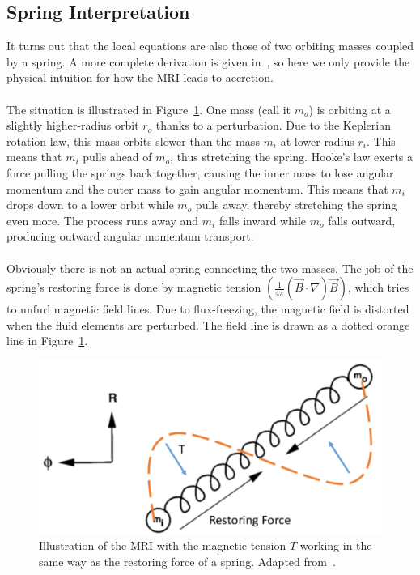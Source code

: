 \subsection{Spring Interpretation}\label{ssec:springs}
It turns out that the local equations are also those of two orbiting masses coupled by a spring. A more complete derivation is given in~, so here we only provide the physical intuition for how the MRI leads to accretion. \\
\\
The situation is illustrated in Figure~\ref{fig:springs}. One mass (call it $m_o$) is orbiting at a slightly higher-radius orbit $r_o$ thanks to a perturbation. Due to the Keplerian rotation law, this mass orbits slower than the mass $m_i$ at lower radius $r_i$. This means that $m_i$ pulls ahead of $m_o$, thus stretching the spring. Hooke's law exerts a force pulling the springs back together, causing the inner mass to lose angular momentum and the outer mass to gain angular momentum. This means that $m_i$ drops down to a lower orbit while $m_o$ pulls away, thereby stretching the spring even more. The process runs away and $m_i$ falls inward while $m_o$ falls outward, producing outward angular momentum transport. \\
\\
Obviously there is not an actual spring connecting the two masses. The job of the spring's restoring force is done by magnetic tension $\left(\frac{1}{4\pi}(\vec B\cdot\nabla)\vec B\right)$, which tries to unfurl magnetic field lines. Due to flux-freezing, the magnetic field is distorted when the fluid elements are perturbed. The field line is drawn as a dotted orange line in Figure~\ref{fig:springs}.
\begin{figure}
  \begin{center}  
    \includegraphics[width=.8\textwidth, angle=0.]{img/mriSpring.pdf}
  \end{center}
  \caption{Illustration of the MRI with the magnetic tension $T$ working in the same way as the restoring force of a spring. Adapted from~.}
  \label{fig:springs}
\end{figure}
%
%
